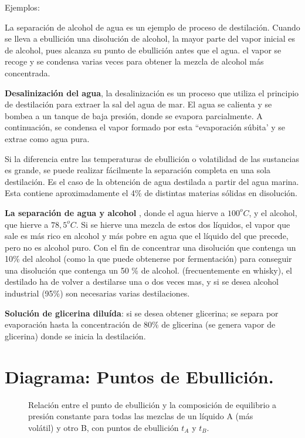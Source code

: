 \documentclass[11pt,openany]{book}
\begin{document}
Ejemplos:

La separación de alcohol de agua es un ejemplo de proceso de destilación. Cuando se lleva a ebullición 
una disolución de alcohol, la mayor parte del vapor inicial es de alcohol, pues alcanza su punto de 
ebullición antes que el agua. el vapor se recoge y se condensa varias veces para obtener la mezcla de alcohol
más concentrada.

\textbf{Desalinización del agua}, la desalinización es un proceso que utiliza el principio de destilación para 
extraer la sal del agua de mar. El agua se calienta y se bombea a un tanque de baja presión, donde 
se evapora parcialmente. A continuación, se condensa el vapor formado por esta ``evaporación súbita' y se 
extrae como agua pura.

Si la diferencia entre las temperaturas de ebullición o volatilidad de las sustancias es grande, se 
puede realizar fácilmente la separación completa en una sola destilación. Es el caso de la obtención de
agua destilada a partir del agua marina. Esta contiene aproximadamente el 4\% de distintas materias 
sólidas en disolución.

\textbf{La separación de agua y alcohol} , donde el agua hierve a $100^oC$, y el alcohol, que hierve a $78,5^oC$. Si 
se hierve una mezcla de estos dos líquidos, el vapor que sale es más rico en alcohol y más pobre en 
agua que el líquido del que precede, pero no es alcohol puro. Con el fin de concentrar una 
disolución que contenga un 10\% del alcohol (como la que puede obtenerse por fermentación) para 
conseguir una disolución que contenga un 50 \% de alcohol. (frecuentemente en whisky), el destilado ha 
de volver a destilarse una o dos veces mas, y si se desea alcohol industrial (95\%) son necesarias 
varias destilaciones.

\textbf{Solución de glicerina diluída}: si se desea obtener glicerina; se separa por evaporación hasta la 
concentración de 80\% de glicerina (se genera vapor de glicerina) donde se inicia la destilación.

\section{Diagrama: Puntos de Ebullición.}
\begin{figure}[h]

\caption{Relación entre el punto de ebullición y la composición de equilibrio a presión constante para todas las 
mezclas de un líquido A (más volátil) y otro B, con puntos de ebullición $t_A$ y $t_B$.
}
\end{figure}
\end{document}
